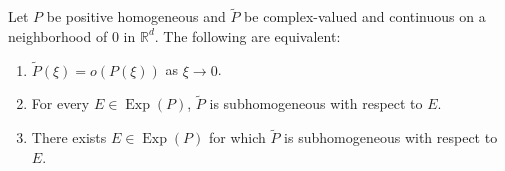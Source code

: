 \documentclass[smallextended]{svjour3}
\theoremstyle{remark}
\newcommand\Exp{\operatorname{Exp}}
\begin{document}
\begin{proposition}\label{prop:Subhomequivtolittleoh}
Let $P$ be positive homogeneous and $\widetilde{P}$ be complex-valued and continuous on a neighborhood of $0$ in $\mathbb{R}^d$. The following are equivalent:
\begin{enumerate}[label=(\alph*), ref=(\alph*)]
    \item\label{item:Subhomequivtolittleoh1} $\widetilde{P}(\xi)=o(P(\xi))$ as $\xi\to 0$.
    \item\label{item:Subhomequivtolittleoh2} For every $E\in\Exp(P)$, $\widetilde{P}$ is subhomogeneous with respect to $E$.
    \item\label{item:Subhomequivtolittleoh3} There exists $E\in\Exp(P)$ for which $\widetilde{P}$ is subhomogeneous with respect to $E$.
\end{enumerate}
\end{proposition}
\end{document}

